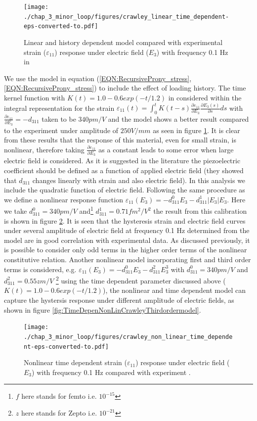 \begin{figure} 
\centering
\texttt{[image: ./chap\_3\_minor\_loop/figures/crawley\_linear\_time\_dependent-eps-converted-to.pdf]}
\caption{Linear and history dependent model compared with experimental strain ($\varepsilon_{11}$) response under electric field ($E_3$) with frequency 0.1 Hz in \cite{Crawley1990}}
\label{fig:Crawley_xp_His_dependent_Lin}
\end{figure}

We use the model in equation (\ref{EQN:RecursiveProny_stress}, \ref{EQN:RecursiveProny_stress}) \cite{tscharnuter2012nonlinear} to include the effect of loading history. 
The time kernel function with $K(t)=1.0-0.6 exp(-t/1.2)$ in considered within the integral representation for the strain $\varepsilon_{11}(t)=\int_0^t
K(t-s)\frac{\partial \varepsilon_{11}}{\partial E_3}\frac{\partial
E_3(s)}{\partial s} ds$ with $\frac{\partial \varepsilon_{11}}{\partial
E_3}=-d_{311}$ taken to be $340 pm/V$ and the model shows a better result compared to the experiment under amplitude of $250V/mm$ as seen in figure \ref{fig:Crawley_xp_His_dependent_Lin}. 
It is clear from these results that the response of this material, even for small strain, is nonlinear, therefore taking $\frac{\partial\varepsilon_{11}}{\partial E_3}$ as a constant leads to some error when large electric field is considered.
As it is suggested in the literature \cite{anderson1989piezoceramic,Crawley1990} the piezoelectric coefficient should be defined as a function of applied electric field (they showed that $d_{311}$ changes linearly with strain and also electric field).
In this analysis we include the quadratic function of electric field. 
Following the same procedure as \cite{tscharnuter2012nonlinear} we define a nonlinear response function $\varepsilon_{11}(E_3)=-d_{311}^0 E_3-d_{311}^1 |E_3| E_3$.
Here we take $d_{311}^0=340pm/V$ and\footnote{$f$ here stands for femto i.e. $10^{-15}$ } $d_{311}^1=0.71 fm^2/V^2 $ the result from this calibration is shown in figure \ref{fig:TimeDepenNonLinCrawley}. It is seen that the hysteresis strain and electric field curves under several amplitude of electric field at frequency 0.1 Hz determined from the model are in good correlation with experimental data.
As discussed previously, it is possible to consider only odd terms in the higher order terms of the nonlinear constitutive relation.
Another nonlinear model incorporating first and third order terms is considered, e.g. $\varepsilon_{11}(E_3)=-d_{311}^0 E_3-d_{311}^2 E_3^3$ with $d_{311}^0=340pm/V$ and $d_{311}^2=0.55 z m/V$ \footnote{$z$ here stands for Zepto i.e. $10^{-21}$ } using the time dependent parameter discussed above ($K(t)=1.0-0.6 exp(-t/1.2)$), 
the nonlinear and time dependent model can capture the hystersis response under different amplitude of electric fields, as shown in figure \ref{fig:TimeDepenNonLinCrawleyThirdordermodel}. 
\begin{figure}
\centering
\texttt{[image: ./chap\_3\_minor\_loop/figures/crawley\_non\_linear\_time\_dependent-eps-converted-to.pdf]}
\caption{Nonlinear time dependent strain ($\varepsilon_{11}$) response under electric field ($E_3$) with frequency 0.1 Hz compared with experiment \cite{Crawley1990}.}
\label{fig:TimeDepenNonLinCrawley}
\end{figure}

